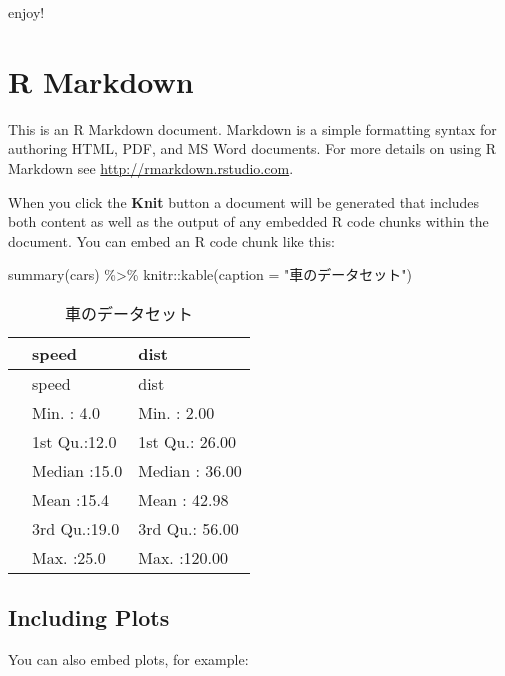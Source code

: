 \documentclass[
  12pt,
  a4paper,xelatex,ja=standard]{bxjsslide}
\newenvironment{Shaded}{\begin{snugshade}}{\end{snugshade}}
\newcommand{\AttributeTok}[1]{\textcolor[rgb]{0.77,0.63,0.00}{#1}}
\newcommand{\FunctionTok}[1]{\textcolor[rgb]{0.00,0.00,0.00}{#1}}
\newcommand{\NormalTok}[1]{#1}
\newcommand{\SpecialCharTok}[1]{\textcolor[rgb]{0.00,0.00,0.00}{#1}}
\newcommand{\StringTok}[1]{\textcolor[rgb]{0.31,0.60,0.02}{#1}}
\begin{document}
enjoy!

\newpage

\hypertarget{r-markdown}{%
\section{R Markdown}\label{r-markdown}}

This is an R Markdown document. Markdown is a simple formatting syntax
for authoring HTML, PDF, and MS Word documents. For more details on
using R Markdown see \url{http://rmarkdown.rstudio.com}.

When you click the \textbf{Knit} button a document will be generated
that includes both content as well as the output of any embedded R code
chunks within the document. You can embed an R code chunk like this:

\begin{Shaded}
\begin{Highlighting}[numbers=left,,]
\FunctionTok{summary}\NormalTok{(cars) }\SpecialCharTok{\%\textgreater{}\%}
\NormalTok{  knitr}\SpecialCharTok{::}\FunctionTok{kable}\NormalTok{(}\AttributeTok{caption =} \StringTok{"車のデータセット"}\NormalTok{)}
\end{Highlighting}
\end{Shaded}

\begin{longtable}[]{@{}lll@{}}
\caption{車のデータセット}\tabularnewline
\toprule
& speed & dist \\
\midrule
\endfirsthead
\toprule
& speed & dist \\
\midrule
\endhead
& Min. : 4.0 & Min. : 2.00 \\
& 1st Qu.:12.0 & 1st Qu.: 26.00 \\
& Median :15.0 & Median : 36.00 \\
& Mean :15.4 & Mean : 42.98 \\
& 3rd Qu.:19.0 & 3rd Qu.: 56.00 \\
& Max. :25.0 & Max. :120.00 \\
\bottomrule
\end{longtable}

\newpage

\hypertarget{including-plots}{%
\subsection{Including Plots}\label{including-plots}}

You can also embed plots, for example:
\end{document}
